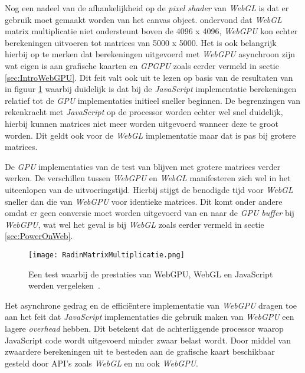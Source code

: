 \bigbreak{}

Nog een nadeel van de afhankelijkheid op de \textit{pixel shader} van \textit{WebGL} is dat er gebruik moet gemaakt worden van het canvas object. \textcite{Radin2021} ondervond dat \textit{WebGL} matrix multiplicatie niet ondersteunt boven de 4096 x 4096, \textit{WebGPU} kon echter berekeningen uitvoeren tot matrices van 5000 x 5000. Het is ook belangrijk hierbij op te merken dat berekeningen uitgevoerd met \textit{WebGPU} asynchroon zijn wat eigen is aan grafische kaarten en \textit{GPGPU} zoals eerder vermeld in sectie \ref{sec:IntroWebGPU}. Dit feit valt ook uit te lezen op basis van de resultaten van \textcite{Radin2021} in figuur \ref{fig:Matrix Multiplication By Radin} waarbij duidelijk is dat bij de \textit{JavaScript} implementatie berekeningen relatief tot de \textit{GPU} implementaties initieel sneller beginnen. De begrenzingen van rekenkracht met \textit{JavaScript} op de processor worden echter wel snel duidelijk, hierbij kunnen matrices niet meer worden uitgevoerd wanneer deze te groot worden. Dit geldt ook voor de \textit{WebGL} implementatie maar dat is pas  bij grotere matrices.

\bigbreak{}

De \textit{GPU} implementaties van de test van \textcite{Radin2021} blijven met grotere matrices verder werken. De verschillen tussen \textit{WebGPU} en \textit{WebGL} manifesteren zich wel in het uiteenlopen van de uitvoeringstijd. Hierbij stijgt de benodigde tijd voor \textit{WebGL} sneller dan die van \textit{WebGPU} voor identieke matrices. Dit komt onder andere omdat er geen conversie moet worden uitgevoerd van en naar de \textit{GPU buffer} bij \textit{WebGPU}, wat wel het geval is bij \textit{WebGL} zoals eerder vermeld in sectie \ref{sec:PowerOnWeb}. 

\break{}

\begin{figure}
    \texttt{[image: RadinMatrixMultiplicatie.png]}
    \caption[Matrixvermenigvuldiging test~\autocite{Radin2021}]{Een test waarbij de prestaties van WebGPU, WebGL en JavaScript werden vergeleken~\autocite{Radin2021}.}
    \label{fig:Matrix Multiplication By Radin}
\end{figure}

Het asynchrone gedrag en de efficiëntere implementatie van \textit{WebGPU} dragen toe aan het feit dat \textit{JavaScript} implementaties die gebruik maken van \textit{WebGPU} een lagere \textit{overhead} hebben. Dit betekent dat de achterliggende processor waarop JavaScript code wordt uitgevoerd minder zwaar belast wordt. Door middel van zwaardere berekeningen uit te besteden aan de grafische kaart beschikbaar gesteld door API's zoals \textit{WebGL} en nu ook \textit{WebGPU}.

